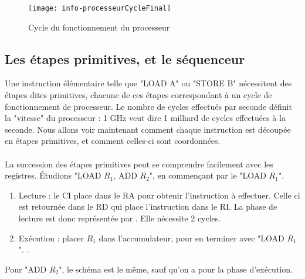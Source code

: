 \documentclass[12pt,a4paper]{report}
\begin{document}
\begin{figure}[h!]
\centering
\texttt{[image: info-processeurCycleFinal]}
\caption{Cycle du fonctionnement du processeur}
\label{fig:processeurFinal}
\end{figure}
\subsection{Les étapes primitives, et le séquenceur}
Une instruction élémentaire telle que "LOAD A" ou "STORE B" nécessitent des étapes dites primitives, chacune de ces étapes correspondant à un cycle de fonctionnement de processeur. Le nombre de cycles effectués par seconde définit la "vitesse" du processeur : 1 GHz veut dire 1 milliard de cycles effectuées à la seconde. Nous allons voir maintenant comment chaque instruction est découpée en étapes primitives, et comment celles-ci sont coordonnées.\\
\\
La succession des étapes primitives peut se comprendre facilement avec les registres. Étudions "LOAD $R_1$, ADD $R_2$", en commençant par le "LOAD $R_1$".
\begin{enumerate}
\item Lecture : le CI place dans le RA pour obtenir l'instruction à effectuer. Celle ci est retournée dans le RD qui place l'instruction dans le RI. La phase de lecture est donc représentée par . Elle nécessite 2 cycles.
\item Exécution : placer $R_1$ dans l'accumulateur, pour en terminer avec "LOAD $R_1$". .
\end{enumerate}
Pour "ADD $R_2$", le schéma est le même, sauf qu'on a  pour la phase d'exécution.
\end{document}
